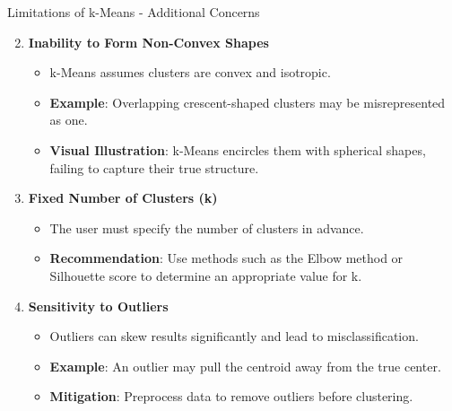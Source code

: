 \documentclass[aspectratio=169]{beamer}
\begin{document}
\begin{frame}[fragile]{Limitations of k-Means - Additional Concerns}
    \begin{enumerate}
        \setcounter{enumi}{1}
        \item \textbf{Inability to Form Non-Convex Shapes}
        \begin{itemize}
            \item k-Means assumes clusters are convex and isotropic.
            \item \textbf{Example}: Overlapping crescent-shaped clusters may be misrepresented as one.
            \item \textbf{Visual Illustration}: k-Means encircles them with spherical shapes, failing to capture their true structure.
        \end{itemize}

        \item \textbf{Fixed Number of Clusters (k)}
        \begin{itemize}
            \item The user must specify the number of clusters in advance.
            \item \textbf{Recommendation}: Use methods such as the Elbow method or Silhouette score to determine an appropriate value for k.
        \end{itemize}

        \item \textbf{Sensitivity to Outliers}
        \begin{itemize}
            \item Outliers can skew results significantly and lead to misclassification.
            \item \textbf{Example}: An outlier may pull the centroid away from the true center.
            \item \textbf{Mitigation}: Preprocess data to remove outliers before clustering.
        \end{itemize}
    \end{enumerate}
\end{frame}
\end{document}
